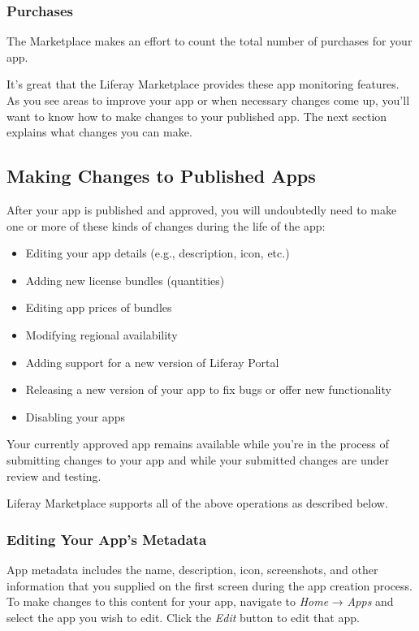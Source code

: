 \subsubsection{Purchases}\label{purchases}

The Marketplace makes an effort to count the total number of purchases
for your app.

It's great that the Liferay Marketplace provides these app monitoring
features. As you see areas to improve your app or when necessary changes
come up, you'll want to know how to make changes to your published app.
The next section explains what changes you can make.

\subsection{Making Changes to Published
Apps}\label{making-changes-to-published-apps}

After your app is published and approved, you will undoubtedly need to
make one or more of these kinds of changes during the life of the app:

\begin{itemize}
\tightlist
\item
  Editing your app details (e.g., description, icon, etc.)
\item
  Adding new license bundles (quantities)
\item
  Editing app prices of bundles
\item
  Modifying regional availability
\item
  Adding support for a new version of Liferay Portal
\item
  Releasing a new version of your app to fix bugs or offer new
  functionality
\item
  Disabling your apps
\end{itemize}

Your currently approved app remains available while you're in the
process of submitting changes to your app and while your submitted
changes are under review and testing.

Liferay Marketplace supports all of the above operations as described
below.

\subsubsection{Editing Your App's
Metadata}\label{editing-your-apps-metadata}

App metadata includes the name, description, icon, screenshots, and
other information that you supplied on the first screen during the app
creation process. To make changes to this content for your app, navigate
to \emph{Home} → \emph{Apps} and select the app you wish to edit. Click
the \emph{Edit} button to edit that app.

